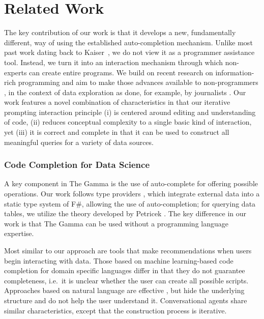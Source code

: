 \documentclass[manuscript,review,anonymous]{acmart}
\begin{document}
\section{Related Work}

The key contribution of our work is that it develops a new, fundamentally different, way of using the
established auto-completion mechanism. Unlike most past work dating back to Kaiser~\cite{assistants},
we do not view it as a programmer assistance tool. Instead, we turn it into an interaction mechanism
through which non-experts can create entire programs. We build on recent research on information-rich
programming \cite{inforich} and aim to make those advances available to non-programmers
\cite{enduser,smallmatter}, in the context of data exploration as done, for example, by journalists
\cite{ddj}. Our work features a novel combination of characteristics in that our iterative prompting
interaction principle (i) is centered around editing and understanding of code,
(ii) reduces conceptual complexity to a single basic kind of interaction, yet (iii) it is
correct and complete in that it can be used to construct all meaningful queries for a variety
of data sources.

\subsubsection*{Code Completion for Data Science}

A key component in The Gamma is the use of auto-complete for offering possible operations.
Our work follows type providers \cite{inforich,fsdata}, which integrate external data into a
static type system of F\#, allowing the use of auto-completion; for querying data tables, we utilize
the theory developed by Petricek \cite{dotdriven}. The key difference in our work is that The Gamma
can be used without a programming language expertise.

Most similar to our approach are tools that make recommendations when users begin interacting
with data. Those based on machine learning-based code completion for domain specific languages \cite{predictive,proactive}
differ in that they do not guarantee completeness, i.e.~it is unclear whether the user can create all possible
scripts. Approaches based on natural language are effective \cite{eviza,codemend}, but hide the
underlying structure and do not help the user understand it. Conversational agents \cite{iris}
share similar characteristics, except that the construction process is iterative.
\end{document}
